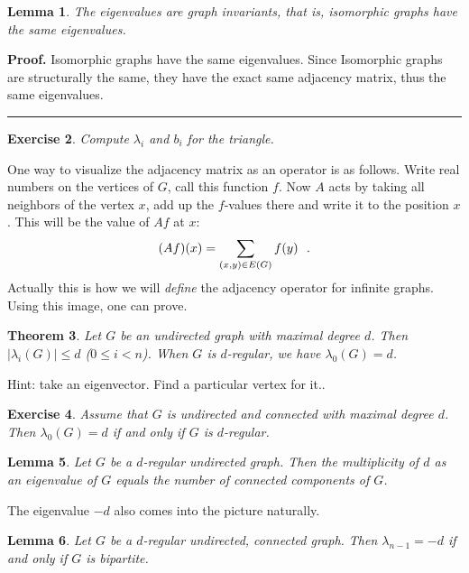 \documentclass[12pt]{article}
\newtheorem{theorem}{Theorem}
\newtheorem{exercise}[theorem]{Exercise}
\newtheorem{lemma}[theorem]{Lemma}
\newenvironment{proof}[1][Proof]{\textbf{#1.} }{\ \rule{0.5em}{0.5em}}
\begin{document}
\begin{lemma}
The eigenvalues are graph invariants, that is, isomorphic graphs have the
same eigenvalues.
\end{lemma}
\begin{proof}
    Isomorphic graphs have the same eigenvalues. Since 
    Isomorphic graphs are structurally the same, 
    they have the exact same adjacency matrix, 
    thus the same eigenvalues.
\end{proof}


\begin{exercise}
Compute $\lambda_{i}$ and $b_{i}$ for the triangle.
\end{exercise}

One way to visualize the adjacency matrix as an operator is as follows.
Write real numbers on the vertices of $G$, call this function $f$. Now $A$
acts by taking all neighbors of the vertex $x$, add up the $f$-values there
and write it to the position $x$. This will be the value of $Af$ at $x$: 
\begin{equation*}
(Af)(x)=\dsum \limits_{(x,y)\in E(G)}f(y)\text{.}
\end{equation*}
Actually this is how we will \emph{define} the adjacency operator for
infinite graphs. Using this image, one can prove.

\begin{theorem}
Let $G$ be an undirected graph with maximal degree $d$. Then $\left\vert
\lambda_{i}(G)\right\vert \leq d$ ($0\leq i<n$). When $G$ is $d$-regular, we
have $\lambda_{0}(G)=d$.
\end{theorem}

Hint: take an eigenvector. Find a particular vertex for it..

\begin{exercise}
Assume that $G$ is undirected and connected with maximal degree $d$. Then $%
\lambda_{0}(G)=d$ if and only if $G$ is $d$-regular.
\end{exercise}

\begin{lemma}
Let $G$ be a $d$-regular undirected graph. Then the multiplicity of $d$ as
an eigenvalue of $G$ equals the number of connected components of $G$.
\end{lemma}

The eigenvalue $-d$ also comes into the picture naturally.

\begin{lemma}
Let $G$ be a $d$-regular undirected, connected graph. Then $\lambda_{n-1}=-d 
$ if and only if $G$ is bipartite.
\end{lemma}
\end{document}
